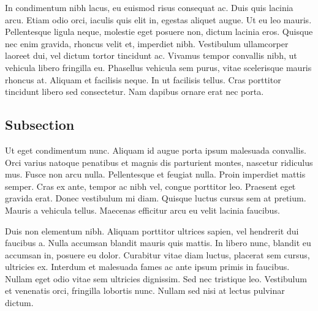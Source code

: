 \documentclass[draft]{yorkUThesisTemplate}
\newcommand{\bibfilename}{backmatter/references}
\begin{document}
In condimentum nibh lacus, eu euismod risus consequat ac. Duis quis lacinia arcu. Etiam odio orci, iaculis quis elit in, egestas aliquet augue. Ut eu leo mauris. Pellentesque ligula neque, molestie eget posuere non, dictum lacinia eros. Quisque nec enim gravida, rhoncus velit et, imperdiet nibh. Vestibulum ullamcorper laoreet dui, vel dictum tortor tincidunt ac. Vivamus tempor convallis nibh, ut vehicula libero fringilla eu. Phasellus vehicula sem purus, vitae scelerisque mauris rhoncus at. Aliquam et facilisis neque. In ut facilisis tellus. Cras porttitor tincidunt libero sed consectetur. Nam dapibus ornare erat nec porta.

\subsection{Subsection}
Ut eget condimentum nunc. Aliquam id augue porta ipsum malesuada convallis. Orci varius natoque penatibus et magnis dis parturient montes, nascetur ridiculus mus. Fusce non arcu nulla. Pellentesque et feugiat nulla. Proin imperdiet mattis semper. Cras ex ante, tempor ac nibh vel, congue porttitor leo. Praesent eget gravida erat. Donec vestibulum mi diam. Quisque luctus cursus sem at pretium. Mauris a vehicula tellus. Maecenas efficitur arcu eu velit lacinia faucibus.

Duis non elementum nibh. Aliquam porttitor ultrices sapien, vel hendrerit dui faucibus a. Nulla accumsan blandit mauris quis mattis. In libero nunc, blandit eu accumsan in, posuere eu dolor. Curabitur vitae diam luctus, placerat sem cursus, ultricies ex. Interdum et malesuada fames ac ante ipsum primis in faucibus. Nullam eget odio vitae sem ultricies dignissim. Sed nec tristique leo. Vestibulum et venenatis orci, fringilla lobortis nunc. Nullam sed nisi at lectus pulvinar dictum.


\end{document}
